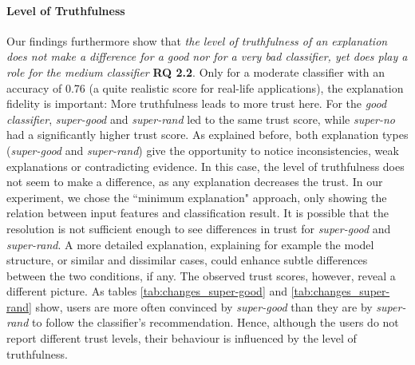 \paragraph{Level of Truthfulness} 
Our findings furthermore show that \textit{the level of truthfulness of an explanation does not make a difference for a good nor for a very bad classifier, yet does play a role for the medium classifier} \textbf{RQ 2.2}. Only for a moderate classifier with an accuracy of 0.76 (a quite realistic score for real-life applications), the explanation fidelity is important: More truthfulness leads to more trust here.\newline
For the \textit{good classifier}, \textit{super-good} and \textit{super-rand} led to the same trust score, while \textit{super-no} had a significantly higher trust score. As explained before, both explanation types (\textit{super-good} and \textit{super-rand}) give the opportunity to notice inconsistencies, weak explanations or contradicting evidence. In this case, the level of truthfulness does not seem to make a difference, as any explanation decreases the trust. In our experiment, we chose the ``minimum explanation" approach, only showing the relation between input features and classification result. It is possible that the resolution is not sufficient enough to see differences in trust for \textit{super-good} and \textit{super-rand}. A more detailed explanation, explaining for example the model structure, or similar and dissimilar cases, could enhance subtle differences between the two conditions, if any. The observed trust scores, however, reveal a different picture. As tables \ref{tab:changes_super-good} and \ref{tab:changes_super-rand} show, users are more often convinced by \textit{super-good} than they are by \textit{super-rand} to follow the classifier's recommendation. Hence, although the users do not report different trust levels, their behaviour is influenced by the level of truthfulness.\newline
